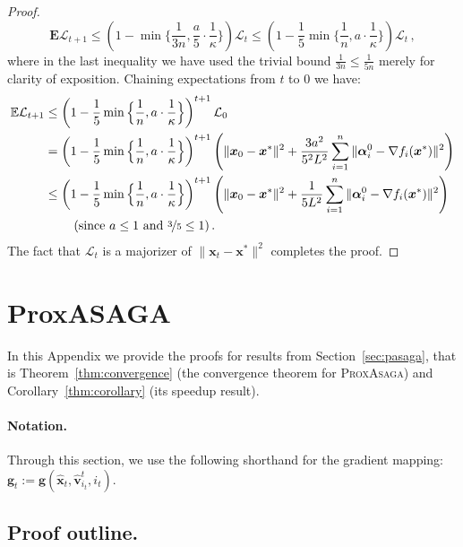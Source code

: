 \documentclass{article}
\def\EE{{\mathbb E}}
\newcommand{\Econd}{\mathbf{E}}
\newcommand{\PASAGA}{\textsc{ProxAsaga}}
\def\xx{{\boldsymbol x}}
\def\vv{{\boldsymbol v}}
\begin{document}
\begin{proof}
\begin{equation}
\Econd\mathcal{L}_{t+1} \leq \left(1 - \min\Big\{\frac{1}{3n}, \frac{a}{5}\cdot \frac{1}{\kappa}\Big\}\right)\mathcal{L}_t \leq \left(1 - \frac{1}{5}\min\Big\{\frac{1}{n}, a\cdot \frac{1}{\kappa}\Big\}\right)\mathcal{L}_t \,,
\end{equation}
where in the last inequality we have used the trivial bound $\frac{1}{3n} \leq \frac{1}{5n}$ merely for clarity of exposition.
Chaining expectations from $t$ to $0$ we have:
\begin{align}
  \EE \mathcal{L}_{t+1} &\leq \left(1 - \frac{1}{5}\min\Big\{\frac{1}{n}, a\cdot \frac{1}{\kappa}\Big\}\right)^{t+1}\mathcal{L}_0 \nonumber\\
  &= \left(1 - \frac{1}{5}\min\Big\{\frac{1}{n}, a\cdot \frac{1}{\kappa}\Big\}\right)^{t+1} \left(\|\xx_0 - \xx^*\|^2 + \frac{3 a^2}{5^2 L^2} \sum_{i=1}^n\|{\boldsymbol\alpha}_i^0 - \nabla f_i(\xx^*)\|^2 \right) \nonumber\\
  &\leq \left(1 - \frac{1}{5}\min\Big\{\frac{1}{n}, a\cdot \frac{1}{\kappa}\Big\}\right)^{t+1} \left(\|\xx_0 - \xx^*\|^2 + \frac{1}{5 L^2} \sum_{i=1}^n\|{\boldsymbol\alpha}_i^0 - \nabla f_i(\xx^*)\|^2 \right) \\
  &\qquad \text{ (since $a \leq 1$ and $\nicefrac{3}{5} \leq 1$)} \,.\nonumber
\end{align}
The fact that $\mathcal{L}_t$ is a majorizer of $\|\xx_{t} - \xx^*\|^2$ completes the proof.
\end{proof}

\clearpage


\section{ProxASAGA}\label{apx:async}

\vspace{0.5em}

In this Appendix we provide the proofs for results from Section~\ref{sec:pasaga}, that is Theorem~\ref{thm:convergence}  (the convergence theorem for \PASAGA) and Corollary~\ref{thm:corollary} (its speedup result).
\paragraph{Notation.} Through this section, we use the following shorthand for the gradient mapping: $\boldsymbol g_t := \boldsymbol g(\hat{\xx}_t, \hat{\vv}^t_{i_t}, i_t)$.

\subsection{Proof outline.}\label{ssec:proof}
\end{document}
